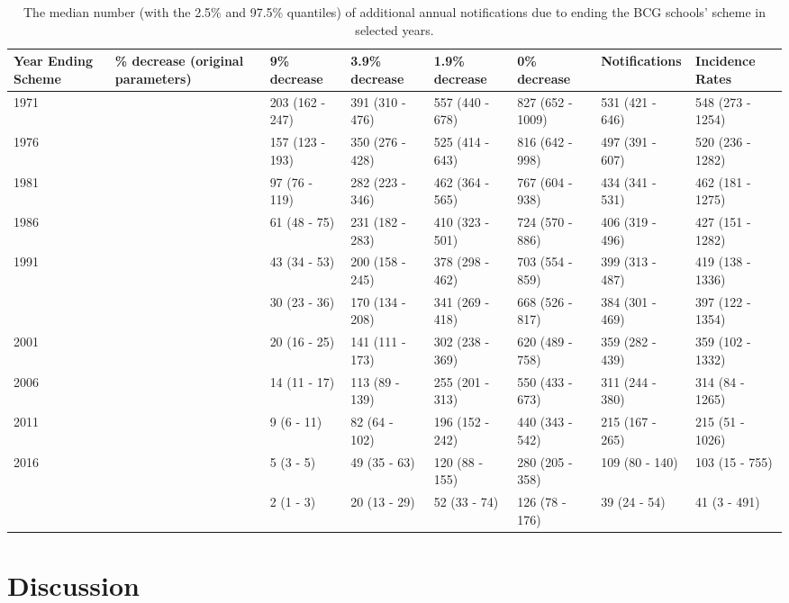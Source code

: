 \documentclass[11pt,twoside]{bristolthesis}
\begin{document}
  \begin{landscape}\begin{table}[!h]
  
  \caption{\label{tab:annual-prevent-tab}The median number (with the 2.5\% and 97.5\% quantiles) of additional annual notifications due to ending the BCG schools' scheme in selected years.}
  \centering
  \fontsize{8}{10}\selectfont
  \begin{tabular}{l>{\raggedright\arraybackslash}p{2cm}llllll}
  \toprule
  Year Ending Scheme & 9\% decrease (original parameters) & 9\% decrease & 3.9\% decrease & 1.9\% decrease & 0\% decrease & Notifications & Incidence Rates\\
  \midrule
  1971 & 204 & 203 (162 - 247) & 391 (310 - 476) & 557 (440 - 678) & 827 (652 - 1009) & 531 (421 - 646) & 548 (273 - 1254)\\
  1976 & 158 & 157 (123 - 193) & 350 (276 - 428) & 525 (414 - 643) & 816 (642 - 998) & 497 (391 - 607) & 520 (236 - 1282)\\
  1981 & 97 & 97 (76 - 119) & 282 (223 - 346) & 462 (364 - 565) & 767 (604 - 938) & 434 (341 - 531) & 462 (181 - 1275)\\
  1986 & 61 & 61 (48 - 75) & 231 (182 - 283) & 410 (323 - 501) & 724 (570 - 886) & 406 (319 - 496) & 427 (151 - 1282)\\
  1991 & 43 & 43 (34 - 53) & 200 (158 - 245) & 378 (298 - 462) & 703 (554 - 859) & 399 (313 - 487) & 419 (138 - 1336)\\
  \addlinespace
  1996 & 30 & 30 (23 - 36) & 170 (134 - 208) & 341 (269 - 418) & 668 (526 - 817) & 384 (301 - 469) & 397 (122 - 1354)\\
  2001 & 20 & 20 (16 - 25) & 141 (111 - 173) & 302 (238 - 369) & 620 (489 - 758) & 359 (282 - 439) & 359 (102 - 1332)\\
  2006 & 14 & 14 (11 - 17) & 113 (89 - 139) & 255 (201 - 313) & 550 (433 - 673) & 311 (244 - 380) & 314 (84 - 1265)\\
  2011 & 9 & 9 (6 - 11) & 82 (64 - 102) & 196 (152 - 242) & 440 (343 - 542) & 215 (167 - 265) & 215 (51 - 1026)\\
  2016 & 5 & 5 (3 - 5) & 49 (35 - 63) & 120 (88 - 155) & 280 (205 - 358) & 109 (80 - 140) & 103 (15 - 755)\\
  \addlinespace
  2021 & 2 & 2 (1 - 3) & 20 (13 - 29) & 52 (33 - 74) & 126 (78 - 176) & 39 (24 - 54) & 41 (3 - 491)\\
  \bottomrule
  \end{tabular}
  \end{table}
  \end{landscape}
  \hypertarget{discussion-2}{%
  \section{Discussion}\label{discussion-2}}
  
\end{document}
